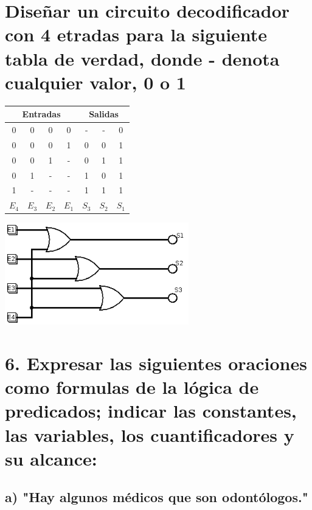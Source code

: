 \documentclass[11pt,letterpaper]{article}
\begin{document}
\section*{Diseñar un circuito decodificador con 4 etradas para la siguiente tabla de verdad, donde - denota cualquier valor, 0 o 1}
\begin{table}[h!]
\centering
\begin{tabular}{| c | c | c | c | | c | c | c |}
\hline
\multicolumn{4}{|c||}{Entradas} & \multicolumn{3}{c|}{Salidas} \\
\hline
0 & 0 & 0 & 0 & - & - & 0 \\
0 & 0 & 0 & 1 & 0 & 0 & 1 \\
0 & 0 & 1 & - & 0 & 1 & 1 \\
0 & 1 & - & - & 1 & 0 & 1 \\
1 & - & - & - & 1 & 1 & 1 \\
\hline
$E_4$ & $E_3$ & $E_2$ & $E_1$ & $S_3$ & $S_2$ & $S_1$ \\
\hline
\end{tabular}
\end{table}

\begin{center}
  \includegraphics[width=8cm]{./imagenes/Ej4.png}
\end{center}






\section*{6. Expresar las siguientes oraciones como formulas de la lógica de predicados; indicar las constantes, las variables, los cuantificadores y su alcance:}

\subsection*{a) "Hay algunos médicos que son odontólogos."}
\end{document}
